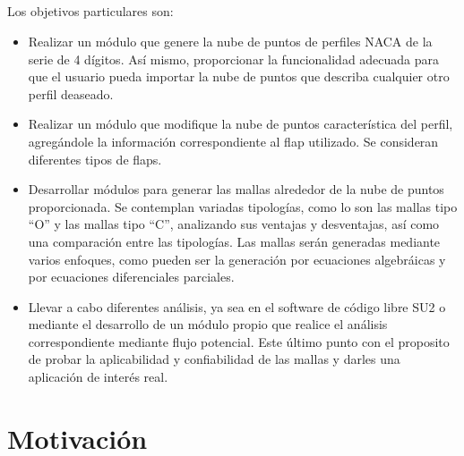 \documentclass[letterpaper, openright, 12pt]{book}
\begin{document}
    \paragraph*{}
    Los objetivos particulares son:
        \begin{itemize}
            \item{Realizar un módulo que genere la nube de puntos de perfiles
                NACA de la serie de 4 dígitos. Así mismo, proporcionar la
                funcionalidad adecuada para que el usuario pueda importar la
                nube de puntos que describa cualquier otro perfil deaseado.}
            \item{Realizar un módulo que modifique la nube de puntos
                característica del perfil, agregándole la información
                correspondiente al flap utilizado. Se consideran
                diferentes tipos de flaps.}
            \item{Desarrollar módulos para generar las mallas alrededor de la
                nube de puntos proporcionada. Se contemplan variadas tipologías,
                como lo son las mallas tipo “O” y las mallas tipo “C”,
                analizando sus ventajas y desventajas, así como una comparación
                entre las tipologías. Las mallas serán generadas mediante varios
                enfoques, como pueden ser la generación por ecuaciones
                algebráicas y por ecuaciones diferenciales parciales.}
            \item{Llevar a cabo diferentes análisis, ya sea en el software de
                código libre SU2 o mediante el desarrollo de un módulo propio
                que realice el análisis correspondiente mediante flujo 
                potencial. Este último punto con el proposito de probar la
                aplicabilidad y confiabilidad de las mallas y darles una
                aplicación de interés real.}
        \end{itemize}




    \chapter*{Motivación}
\end{document}

